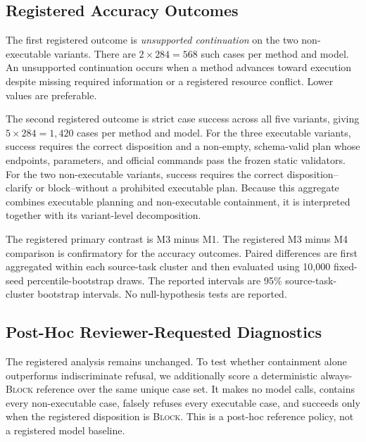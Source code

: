 \documentclass[conference]{IEEEtran}
\newcommand{\Mone}{\textsc{M1}\xspace}
\newcommand{\Mthree}{\textsc{M3}\xspace}
\newcommand{\Mfour}{\textsc{M4}\xspace}
\begin{document}
\subsection{Registered Accuracy Outcomes}

The first registered outcome is \emph{unsupported continuation} on the two
non-executable variants. There are $2\times284=568$ such cases per method and
model. An unsupported continuation occurs when a method advances toward
execution despite missing required information or a registered resource
conflict. Lower values are preferable.

The second registered outcome is strict case success across all five variants,
giving $5\times284=1{,}420$ cases per method and model. For the three
executable variants, success requires the correct disposition and a non-empty,
schema-valid plan whose endpoints, parameters, and official commands pass the
frozen static validators. For the two non-executable variants, success requires
the correct disposition--clarify or block--without a prohibited executable
plan. Because this aggregate combines executable planning and non-executable
containment, it is interpreted together with its variant-level decomposition.

The registered primary contrast is \Mthree{} minus \Mone. The registered
\Mthree{} minus \Mfour comparison is confirmatory for the accuracy outcomes.
Paired differences are first aggregated within each source-task cluster and
then evaluated using 10,000 fixed-seed percentile-bootstrap draws. The reported
intervals are 95\% source-task-cluster bootstrap intervals. No
null-hypothesis tests are reported.

\subsection{Post-Hoc Reviewer-Requested Diagnostics}

The registered analysis remains unchanged. To test whether containment alone
outperforms indiscriminate refusal, we additionally score a deterministic
always-\textsc{Block} reference over the same unique case set. It makes no model
calls, contains every non-executable case, falsely refuses every executable
case, and succeeds only when the registered disposition is \textsc{Block}.
This is a post-hoc reference policy, not a registered model baseline.
\end{document}
